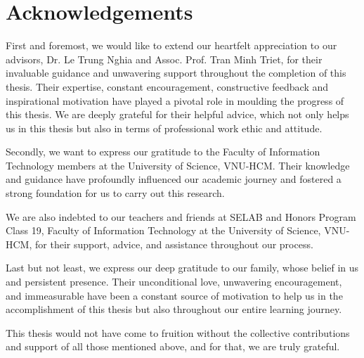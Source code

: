 \chapter{Acknowledgements}
\label{thanks}
First and foremost, we would like to extend our heartfelt appreciation to our advisors, Dr. Le Trung Nghia and Assoc. Prof. Tran Minh Triet, for their invaluable guidance and unwavering support throughout the completion of this thesis. Their expertise, constant encouragement, constructive feedback and inspirational motivation have played a pivotal role in moulding the progress of this thesis. We are deeply grateful for their helpful advice, which not only helps us in this thesis but also in terms of professional work ethic and attitude.

Secondly, we want to express our gratitude to the Faculty of Information Technology members at the University of Science, VNU-HCM. Their knowledge and guidance have profoundly influenced our academic journey and fostered a strong foundation for us to carry out this research. 

We are also indebted to our teachers and friends at SELAB and Honors Program Class 19, Faculty of Information Technology at the University of Science, VNU-HCM, for their support, advice, and assistance throughout our process.

Last but not least, we express our deep gratitude to our family, whose belief in us and persistent presence. Their unconditional love, unwavering encouragement, and immeasurable have been a constant source of motivation to help us in the accomplishment of this thesis but also throughout our entire learning journey.

This thesis would not have come to fruition without the collective contributions and support of all those mentioned above, and for that, we are truly grateful.


